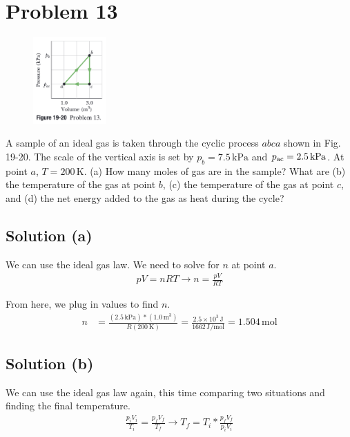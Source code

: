 \documentclass[12pt]{article}
\begin{document}
    \pagebreak
    \section{Problem 13}
        \begin{figure}
            \vspace{-30pt}
            \includegraphics[width=0.25\textwidth]{picture_19-20.png} 
        \end{figure}
        A sample of an ideal gas is taken through the cyclic process $abca$ shown in Fig. 19-20. 
        The scale of the vertical axis is set by $p_b = 7.5\,\unit{\kilo\pascal}$ and $p_{\rm ac} = 2.5\,\unit{\kilo\pascal}$. 
        At point $a$, $T = 200\,\unit{\kelvin}$.
        (a) How many moles of gas are in the sample? 
        What are (b) the temperature of the gas at point $b$, (c) the temperature of the gas at point $c$, and (d) the net energy added to the gas as heat during the cycle?

        \subsection{Solution (a)}
            We can use the ideal gas law.
            We need to solve for $n$ at point $a$. 
            \begin{gather}
                pV  =   nRT \to n   =   \frac{pV}{RT}
            \end{gather}

            From here, we plug in values to find $n$.
            \begin{align}
                n   &=  \frac{(2.5\,\unit{\kilo\pascal}) * (1.0\,\unit{\meter^3})}{R (200\,\unit{\kelvin})}
                    =   \frac{2.5 \times 10^3\,\unit{\joule}}{1662\,\unit{\joule/\mole}}
                    =   \boxed{1.504\,\unit{\mole}}
            \end{align}

        \subsection{Solution (b)}
            We can use the ideal gas law again, this time comparing two situations and finding the final temperature.
            \begin{gather}
                \frac{p_i V_i}{T_i} =   \frac{p_f V_f}{T_f} \to
                    T_f =   T_i * \frac{p_f V_f}{p_i V_i}
            \end{gather}
\end{document}
